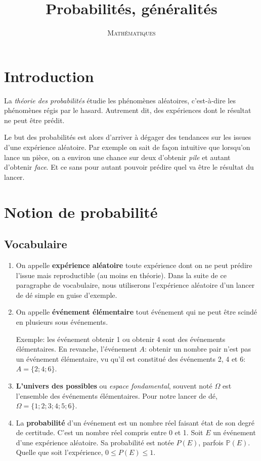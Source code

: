 \documentclass[a4paper,12pt]{scrartcl}
\date{}
\title{Probabilités, généralités}
\author{\textsc{Mathématiques}}
\begin{document}
\maketitle

\tableofcontents

\section*{Introduction}

La \emph{théorie des probabilités} étudie les phénomènes aléatoires, c'est-à-dire les phénomènes régis par le hasard. Autrement dit, des expériences dont le résultat ne peut être prédit.

Le but des probabilités est alors d'arriver à dégager des tendances sur les issues d'une expérience aléatoire. Par exemple on sait de façon intuitive que lorsqu'on lance un pièce, on a \og{}environ une chance sur deux\fg{} d'obtenir \emph{pile} et autant d'obtenir \emph{face}. Et ce sans pour autant pouvoir prédire quel va être le résultat du lancer.

\section{Notion de probabilité}

\subsection{Vocabulaire}

\begin{enumerate}
 \item On appelle \textbf{expérience aléatoire} toute expérience dont on ne peut prédire l'issue mais reproductible (au moins en théorie). Dans la suite de ce paragraphe de vocabulaire, nous utiliserons l'expérience aléatoire d'un lancer de dé simple en guise d'exemple.
 
 \item On appelle \textbf{événement élémentaire} tout événement qui ne peut être scindé en plusieurs sous événements. 
 
 Exemple: les événement \og{}obtenir 1\fg{} ou \og{}obtenir 4\fg{} sont des événements élémentaires. En revanche, l'événement $A$: \og{}obtenir un nombre pair\fg{} n'est pas un événement élémentaire, vu qu'il est constitué des événements 2, 4 et 6: $A = \{2;4;6\}$.
 
 \item \textbf{L'univers des possibles} ou \emph{espace fondamental}, souvent noté $\Omega$ est l'ensemble des événements élémentaires. Pour notre lancer de dé, $\Omega = \{1;2;3;4;5;6\}$.
 
 \item La \textbf{probabilité} d'un événement est un nombre réel faisant état de son degré de certitude. C'est un nombre réel compris entre 0 et 1. Soit $E$ un événement d'une expérience aléatoire. Sa probabilité est notée $P(E)$, parfois $\mathbb{P}(E)$. Quelle que soit l'expérience, $0 \leqslant P(E) \leqslant 1$.
\end{enumerate}
\end{document}
